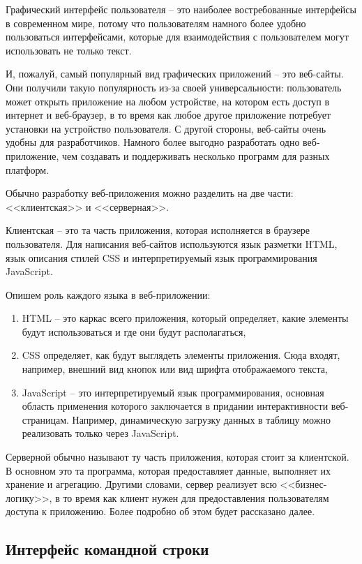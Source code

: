 Графический интерфейс пользователя -- это наиболее востребованные интерфейсы в современном мире, потому
что пользователям намного более удобно пользоваться интерфейсами, которые для взаимодействия
с пользователем могут использовать не только текст. 

И, пожалуй, самый популярный вид графических приложений -- это веб-сайты.
Они получили такую популярность из-за своей универсальности: пользователь
может открыть приложение на любом устройстве, на котором есть доступ в интернет
и веб-браузер, в то время как любое другое приложение потребует установки
на устройство пользователя. С другой стороны, веб-сайты очень удобны для
разработчиков. Намного более выгодно разработать одно веб-приложение, чем
создавать и поддерживать несколько программ для разных платформ.

Обычно разработку веб-приложения можно разделить на две части:
<<клиентская>> и <<серверная>>.

Клиентская -- это та часть приложения, которая исполняется в браузере пользователя.
Для написания веб-сайтов используются язык разметки HTML, язык описания стилей CSS и интерпретируемый
язык программирования JavaScript\cite{Web-book}.

Опишем роль каждого языка в веб-приложении:
\begin{enumerate}
    \item HTML -- это каркас всего приложения, который определяет, какие элементы будут использоваться и
    где они будут располагаться,
    \item CSS определяет, как будут выглядеть элементы приложения. Сюда входят, например, внешний вид кнопок
    или вид шрифта отображаемого текста,
    \item JavaScript -- это интерпретируемый язык программирования, основная область применения которого заключается
    в придании интерактивности веб-страницам. Например, динамическую загрузку данных в таблицу можно реализовать только
    через JavaScript. 
    
\end{enumerate}

Серверной обычно называют ту часть приложения, которая стоит за клиентской. В основном это
та программа, которая предоставляет данные, выполняет их хранение и агрегацию. Другими словами,
сервер реализует всю <<бизнес-логику>>, в то время как клиент нужен для предоставления
пользователям доступа к приложению. Более подробно об этом будет рассказано далее.

\subsection*{Интерфейс командной строки}

